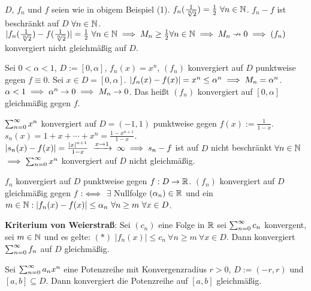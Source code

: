 \documentclass[a4paper,twoside,DIV15,BCOR12mm]{scrbook}
\begin{document}
\begin{beispiele}
\item $D$, $f_n$ und $f$ seien wie in obigem Beispiel (1). $f_n(\frac{1}{\sqrt[n]{2}}) = \frac{1}{2} \ \forall n\in\mathbb{N}$. $f_n - f$ ist beschränkt auf $D$ $\forall n\in\mathbb{N}$. $|f_n(\frac{1}{\sqrt[n]{2}}) - f(\frac{1}{\sqrt[n]{2}})| = \frac{1}{2} \ \forall n\in\mathbb{N} \implies M_n \ge \frac{1}{2} \forall n\in\mathbb{N} \implies M_n \nrightarrow 0 \implies (f_n)$ konvergiert nicht gleichmäßig auf $D$.

\item Sei $0<\alpha<1$, $D:=[0,\alpha]$, $f_n(x)=x^n$, $(f_n)$ konvergiert auf $D$ punktweise gegen $f\equiv0$. Sei $x\in D = [0,\alpha]$. $|f_n(x) - f(x)| = x^n \le \alpha^n \implies M_n = \alpha^n$. $\alpha < 1 \implies \alpha^n \to 0 \implies M_n \to 0$. Das heißt $(f_n)$ konvergiert auf $[0,\alpha]$ gleichmäßig gegen $f$.

\item $\sum_{n=0}^{\infty}{x^n}$ konvergiert auf $D= (-1,1)$ punktweise gegen $f(x) := \frac{1}{1-x}$. $s_n(x) = 1 + x+ \cdots +x^n = \frac{1-x^{n+1}}{1-x}$. $|s_n(x) - f(x)| = \frac{|x|^{n+1}}{1-x} \towegen{x\to1} \infty \folgt s_n - f$ ist auf $D$ nicht beschränkt $\forall n\in\mathbb{N}$ $\implies \sum_{n=0}^{\infty}{x^n}$ konvergiert auf $D$ nicht gleichmäßig.

\end{beispiele}

\begin{satz}[Funktionskonvergenzkriterien]
\begin{liste}
\item $f_n$ konvergiert auf $D$ punktweise gegen $f:D\to\mathbb{R}$. $(f_n)$ konvergiert auf $D$ gleichmäßig gegen $f$ $:\iff$ $\exists$ Nullfolge $(\alpha_n) \in \mathbb{R}$ und ein $m\in\MdN: |f_n(x) - f(x)| \le \alpha_n \ \forall n\ge m \ \forall x \in D$.
\item \textbf{Kriterium von Weierstraß}: Sei $(c_n)$ eine Folge in $\mathbb{R}$ sei $\sum_{n=0}^{\infty}{c_n}$ konvergent, sei $m\in\mathbb{N}$ und es gelte: $(*)$ $|f_n(x)| \le c_n \ \forall n\ge m \ \forall x\in D$. Dann konvergiert $\sum_{n=0}^{\infty}{f_n}$ auf $D$ gleichmäßig.
\item Sei $\sum_{n=0}^{\infty}{a_nx^n}$ eine Potenzreihe mit Konvergenzradius $r>0$, $D:= (-r,r)$ und $[a,b] \subseteq D$. Dann konvergiert die Potenzreihe auf $[a,b]$ gleichmäßig.
\end{liste}
\end{satz}
\end{document}
